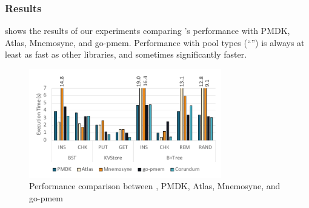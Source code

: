 

\subsubsection{Results}
\label{sec:res:perf:res}


 shows the results of our experiments comparing \this{}'s performance with PMDK, Atlas, Mnemosyne, and go-pmem. 
Performance with pool types (``\this{}'') is always at least as fast as other libraries,
and sometimes significantly faster.

\begin{figure}
    \begin{center}
    \includegraphics[width=3.3in]{Graphs/perf.pdf}
    \end{center}
    \caption{\label{fig:perf} Performance comparison between \this{}, PMDK, Atlas, Mnemosyne, and go-pmem}
\end{figure}

